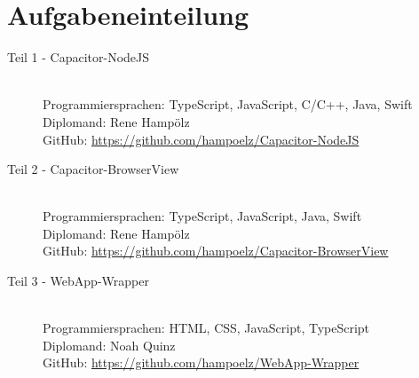 \section{Aufgabeneinteilung}

\begin{description}
    \item[Teil 1 - Capacitor-NodeJS] \hfill\\
    Programmiersprachen: TypeScript, JavaScript, C/C++, Java, Swift\\
    Diplomand: Rene Hampölz\\
    GitHub: \href{https://github.com/hampoelz/Capacitor-NodeJS}{https://github.com/hampoelz/Capacitor-NodeJS}
    \item[Teil 2 - Capacitor-BrowserView] \hfill\\
    Programmiersprachen: TypeScript, JavaScript, Java, Swift\\
    Diplomand: Rene Hampölz\\
    GitHub: \href{https://github.com/hampoelz/Capacitor-BrowserView}{https://github.com/hampoelz/Capacitor-BrowserView}
    \item[Teil 3 - WebApp-Wrapper] \hfill\\
    Programmiersprachen: HTML, CSS, JavaScript, TypeScript\\
    Diplomand: Noah Quinz\\
    GitHub: \href{https://github.com/hampoelz/WebApp-Wrapper}{https://github.com/hampoelz/WebApp-Wrapper}
\end{description}